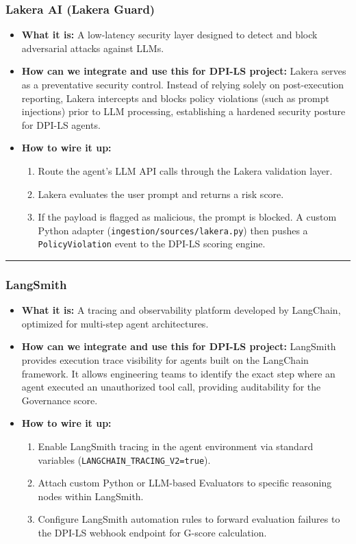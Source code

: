 \documentclass[11pt,a4paper]{article}
\begin{document}
\subsubsection*{Lakera AI (Lakera Guard)}
\begin{itemize}
    \item \textbf{What it is:} A low-latency security layer designed to detect and block adversarial attacks against LLMs.
    \item \textbf{How can we integrate and use this for DPI-LS project:} Lakera serves as a preventative security control. Instead of relying solely on post-execution reporting, Lakera intercepts and blocks policy violations (such as prompt injections) prior to LLM processing, establishing a hardened security posture for DPI-LS agents.
    \item \textbf{How to wire it up:}
    \begin{enumerate}
        \item Route the agent's LLM API calls through the Lakera validation layer.
        \item Lakera evaluates the user prompt and returns a risk score.
        \item If the payload is flagged as malicious, the prompt is blocked. A custom Python adapter (\texttt{ingestion/sources/lakera.py}) then pushes a \texttt{PolicyViolation} event to the DPI-LS scoring engine.
    \end{enumerate}
\end{itemize}

\vspace{0.2cm}\hrule\vspace{0.2cm}

\subsubsection*{LangSmith}
\begin{itemize}
    \item \textbf{What it is:} A tracing and observability platform developed by LangChain, optimized for multi-step agent architectures.
    \item \textbf{How can we integrate and use this for DPI-LS project:} LangSmith provides execution trace visibility for agents built on the LangChain framework. It allows engineering teams to identify the exact step where an agent executed an unauthorized tool call, providing auditability for the Governance score.
    \item \textbf{How to wire it up:}
    \begin{enumerate}
        \item Enable LangSmith tracing in the agent environment via standard variables (\texttt{LANGCHAIN\_TRACING\_V2=true}).
        \item Attach custom Python or LLM-based Evaluators to specific reasoning nodes within LangSmith.
        \item Configure LangSmith automation rules to forward evaluation failures to the DPI-LS webhook endpoint for G-score calculation.
    \end{enumerate}
\end{itemize}
\end{document}
